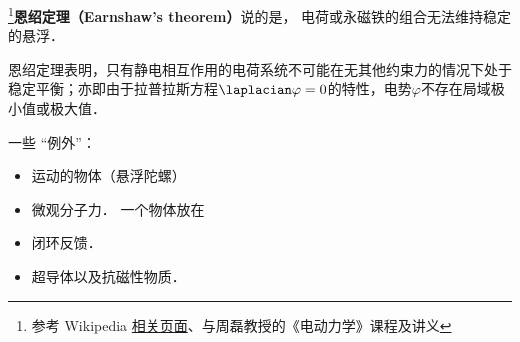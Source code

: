 
\begin{issues}
\issueDraft
\end{issues}

\footnote{参考 Wikipedia \href{https://en.wikipedia.org/wiki/Earnshaw's_theorem}{相关页面}、\cite{GriffE}与周磊教授的《电动力学》课程及讲义}\textbf{恩绍定理（Earnshaw's theorem）}说的是， 电荷或永磁铁的组合无法维持稳定的悬浮．

恩绍定理表明，只有静电相互作用的电荷系统不可能在无其他约束力的情况下处于稳定平衡；亦即由于拉普拉斯方程$\laplacian \varphi = 0$的特性，电势$\varphi$不存在局域极小值或极大值．

一些 “例外”：
\begin{itemize}
\item 运动的物体（悬浮陀螺）
\item 微观分子力． 一个物体放在
\item 闭环反馈．
\item 超导体以及抗磁性物质．
\end{itemize}
